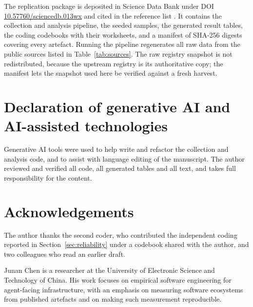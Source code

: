\documentclass[a4paper,fleqn]{cas-dc}
\begin{document}
The replication package is deposited in Science Data Bank under DOI
\href{https://doi.org/10.57760/sciencedb.013wx}{10.57760/sciencedb.013wx} and
cited in the reference list \citep{replicationpackage}. It contains the
collection and analysis pipeline, the seeded samples, the generated result
tables, the coding codebooks with their worksheets, and a manifest of SHA-256
digests covering every artefact. Running the pipeline regenerates all raw data
from the public sources listed in Table~\ref{tab:sources}. The raw registry
snapshot is not redistributed, because the upstream registry is its
authoritative copy; the manifest lets the snapshot used here be verified
against a fresh harvest.

\section*{Declaration of generative AI and AI-assisted technologies}

Generative AI tools were used to help write and refactor the collection and
analysis code, and to assist with language editing of the manuscript. The
author reviewed and verified all code, all generated tables and all text, and
takes full responsibility for the content.

\section*{Acknowledgements}

The author thanks the second coder, who contributed the independent coding
reported in Section~\ref{sec:reliability} under a codebook shared with the
author, and two colleagues who read an earlier draft.




\bio{}
Junan Chen is a researcher at the University of Electronic Science and
Technology of China. His work focuses on empirical software engineering for
agent-facing infrastructure, with an emphasis on measuring software ecosystems
from published artefacts and on making such measurement reproducible.
\endbio
\end{document}
